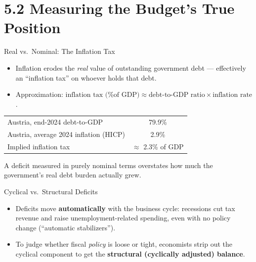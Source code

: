 \documentclass[11pt,aspectratio=169]{beamer}
\begin{document}
\section{5.2 Measuring the Budget's True Position}

\begin{frame}{Real vs.\ Nominal: The Inflation Tax}
  \small
  \begin{itemize}
    \item Inflation erodes the \emph{real} value of outstanding government debt --- effectively an ``inflation tax'' on whoever holds that debt.
    \item Approximation: $\text{inflation tax (\% of GDP)} \approx \text{debt-to-GDP ratio} \times \text{inflation rate}$.
  \end{itemize}
  \vspace{0.3em}
  \begin{center}
  \begin{tabular}{@{}lc@{}}
    \toprule
    Austria, end-2024 debt-to-GDP & 79.9\% \\
    Austria, average 2024 inflation (HICP) & 2.9\% \\
    \midrule
    Implied inflation tax & $\approx$ 2.3\% of GDP \\
    \bottomrule
  \end{tabular}
  \end{center}
  \vspace{0.3em}

  A deficit measured in purely nominal terms overstates how much the government's real debt burden actually grew.\\
 
\end{frame}

\begin{frame}{Cyclical vs.\ Structural Deficits}
  \small
  \begin{itemize}
    \item Deficits move \textbf{automatically} with the business cycle: recessions cut tax revenue and raise unemployment-related spending, even with no policy change (``automatic stabilizers'').
    \item To judge whether fiscal \emph{policy} is loose or tight, economists strip out the cyclical component to get the \textbf{structural (cyclically adjusted) balance}.
\end{itemize}
\end{frame}
\end{document}
